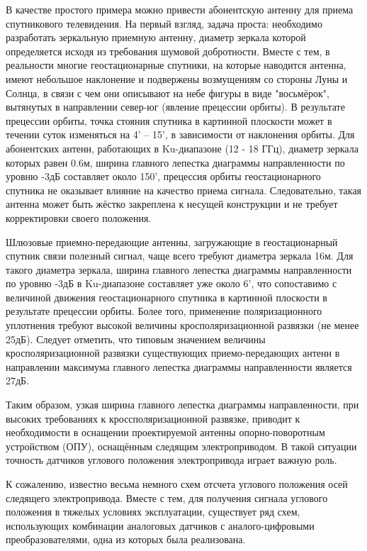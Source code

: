 В качестве простого примера можно привести абонентскую антенну для приема спутникового телевидения. 
На первый взгляд, задача проста: необходимо разработать зеркальную приемную антенну, диаметр зеркала которой определяется исходя из требования шумовой добротности. 
Вместе с тем, в реальности многие геостационарные спутники, на которые наводится антенна, имеют небольшое наклонение и подвержены возмущениям со стороны Луны и Солнца, 
в связи с чем они описывают на небе фигуры в виде "восьмёрок", вытянутых в направлении север-юг (явление прецессии орбиты). 
В результате прецессии орбиты, точка стояния спутника в картинной плоскости может в течении суток изменяться на 4' – 15', в зависимости от наклонения орбиты. 
Для абонентских антенн, работающих в Ku-диапазоне (12 - 18 ГГц), диаметр зеркала которых равен 0.6м, ширина главного лепестка диаграммы направленности по уровню -3дБ составляет около 150', 
прецессия орбиты геостационарного спутника не оказывает влияние на качество приема сигнала. Следовательно, такая антенна может быть жёстко закреплена к несущей конструкции 
и не требует корректировки своего положения. 

Шлюзовые приемно-передающие антенны, загружающие в геостационарный спутник связи полезный сигнал, чаще всего требуют диаметра зеркала 16м. 
Для такого диаметра зеркала, ширина главного лепестка диаграммы направленности по уровню -3дБ в Ku-диапазоне составляет уже около 6', 
что сопоставимо с величиной движения геостационарного спутника в картинной плоскости в результате прецессии орбиты. 
Более того, применение поляризационного уплотнения требуют высокой величины кросполяризационной развязки (не менее 25дБ). 
Следует отметить, что типовым значением величины кросполяризационной развязки существующих приемо-передающих антенн 
в направлении максимума главного лепестка диаграммы направленности является 27дБ. 

Таким образом, узкая ширина главного лепестка диаграммы направленности, при высоких требованиях к кроссполяризационной развязке, 
приводит к необходимости в оснащении проектируемой антенны опорно-поворотным устройством (ОПУ), оснащённым следящим электроприводом.  
В такой ситуации точность датчиков углового положения электропривода играет важную роль.  

К сожалению, известно весьма немного схем отсчета углового положения осей следящего электропривода. Вместе с тем, для получения сигнала углового положения в тяжелых условиях эксплуатации, 
существует ряд схем, использующих комбинации аналоговых датчиков с аналого-цифровыми преобразователями, одна из которых была реализована.

